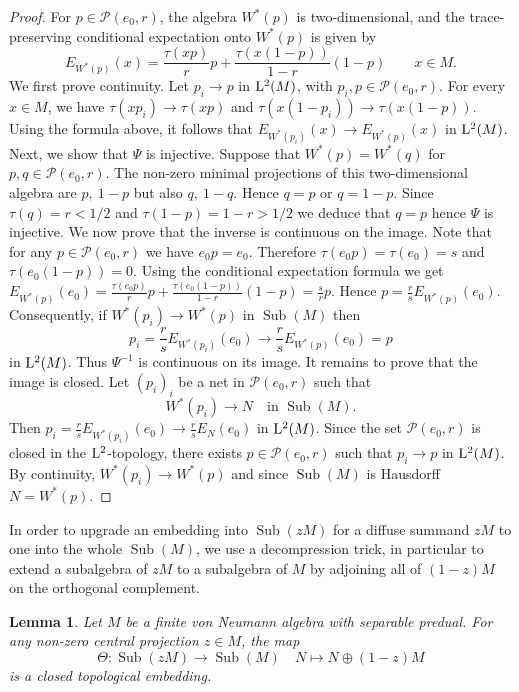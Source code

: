 \documentclass[12pt]{amsart} %
\theoremstyle{plain}
\newtheorem{lemma}[theorem]{Lemma}
\theoremstyle{definition}
\DeclareMathOperator{\Sub}{Sub}
\begin{document}
\begin{proof}
For \(p\in\mathcal P(e_0,r)\), the algebra $W^*(p)$ is two-dimensional, and the trace-preserving conditional expectation onto \(W^*(p)\)
is given by
\[
        E_{W^*(p)}(x)
        =
        \frac{\tau(xp)}{r}p
        +
        \frac{\tau(x(1-p))}{1-r}(1-p)\qquad x\in M.
\]
\noindent We first prove continuity. Let \(p_i\to p\) in \({\rm L}^2(M)\), with
\(p_i,p\in\mathcal P(e_0,r)\). For every \(x\in M\), we have $\tau(xp_i)\to \tau(xp)$ and  $\tau(x(1-p_i))\to \tau(x(1-p))$.
Using the formula above, it follows that $E_{W^*(p_i)}(x)\to E_{W^*(p)}(x)$ in ${\rm L}^2(M)$.
\medskip
\noindent Next, we show that \(\Psi\) is injective. Suppose that $W^*(p)=W^*(q)$ for \(p,q\in\mathcal P(e_0,r)\). The non-zero minimal projections of this two-dimensional
algebra are $p,\ 1-p$ but also $q,\ 1-q$. Hence $q=p$ or $q=1-p$. Since $\tau(q)=r<1/2$ and $\tau(1-p)=1-r>1/2$ we deduce that $q=p$ hence \(\Psi\) is injective.
\medskip
\noindent We now prove that the inverse is continuous on the image. Note that for any $p\in\mathcal{P}(e_0,r)$ we have $e_0p=e_0$. Therefore $\tau(e_0p)=\tau(e_0)=s$ and $\tau(e_0(1-p))=0$. Using the conditional expectation formula we get $E_{W^*(p)}(e_0)
        =
        \frac{\tau(e_0p)}{r}p
        +
        \frac{\tau(e_0(1-p))}{1-r}(1-p)
        =
        \frac{s}{r}p$. Hence $p=\frac{r}{s}E_{W^*(p)}(e_0)$. Consequently, if $W^*(p_i)\to W^*(p)$ in $\Sub(M)$ then
\[
        p_i
        =
        \frac{r}{s}E_{W^*(p_i)}(e_0)
        \longrightarrow
        \frac{r}{s}E_{W^*(p)}(e_0)
        =
        p
\]
in \({\rm L}^2(M)\). Thus \(\Psi^{-1}\) is continuous on its image.
\medskip
\noindent It remains to prove that the image is closed. Let \((p_i)_i\) be a net in
\(\mathcal P(e_0,r)\) such that
\[
        W^*(p_i)\to N
        \quad
        \text{in }\Sub(M).
\]
Then $p_i= \frac{r}{s}E_{W^*(p_i)}(e_0)\rightarrow\frac{r}{s}E_N(e_0)$ in ${\rm L}^2(M)$. Since the set \(\mathcal P(e_0,r)\) is closed in the \({\rm L}^2\)-topology, there exists
\(p\in\mathcal P(e_0,r)\) such that $p_i\to p$ in ${\rm L}^2(M)$. By continuity, $W^*(p_i)\to W^*(p)$ and since  \(\Sub(M)\) is Hausdorff $N=W^*(p)$.\end{proof}
In order to upgrade an embedding into $\Sub(zM)$ for a diffuse summand $zM$ to one into the whole $\Sub(M)$, we use a decompression trick, in particular to extend a subalgebra of $zM$ to a subalgebra of $M$ by adjoining all of $(1-z)M$ on the orthogonal complement.
\begin{lemma}\label{LemDecompression}
Let $M$ be a finite von Neumann algebra with separable predual. For any non-zero central projection $z\in M$, the map
$$\Theta:\Sub(zM)\to\Sub(M)\quad N\mapsto N\oplus(1-z)M$$
is a closed topological embedding.
\end{lemma}
\end{document}
